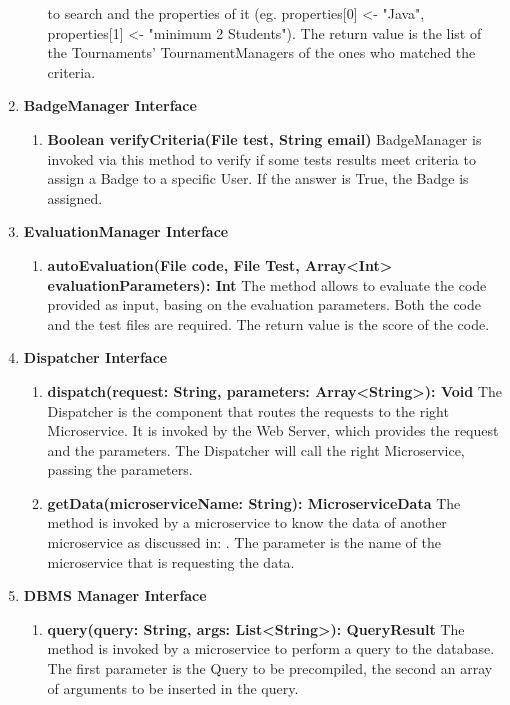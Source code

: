 \begin{enumerate}
\begin{enumerate}[label=$\bullet$]
            to search and the properties of it (eg. properties[0] <- "Java", properties[1] <- "minimum 2 Students"). The return value is the list of the Tournaments' TournamentManagers of the ones who matched the criteria.
        \end{enumerate}
    \item \textbf{BadgeManager Interface}
        \begin{enumerate}[label=$\bullet$]
            \item \textbf{Boolean verifyCriteria(File test, String email)} BadgeManager is invoked via this method to verify if some tests results meet criteria to assign a Badge to a specific User. If the answer is True, the Badge
            is assigned.
        \end{enumerate}
    \item \textbf{EvaluationManager Interface}
        \begin{enumerate}[label=$\bullet$]
            \item \textbf{autoEvaluation(File code, File Test, Array<Int> evaluationParameters): Int} The method allows to evaluate the code provided as input, basing on the evaluation parameters. Both the code and the test files are
            required. The return value is the score of the code.
        \end{enumerate}
    \item \textbf{Dispatcher Interface}
        \begin{enumerate}[label=$\bullet$]
            \item \textbf{dispatch(request: String, parameters: Array<String>): Void} The Dispatcher is the component that routes the requests to the right Microservice. It is invoked by the Web Server, which provides the request and the 
            parameters. The Dispatcher will call the right Microservice, passing the parameters.
            \item \textbf{getData(microserviceName: String): MicroserviceData} \label{meth:dispGetData}The method is invoked by a microservice to know the data of another microservice as discussed in: . The parameter is the name of the microservice that is requesting the data.
        \end{enumerate}
    \item \textbf{DBMS Manager Interface}
        \begin{enumerate} [label=$\bullet$]
            \item \textbf{query(query: String, args: List<String>): QueryResult} The method is invoked by a microservice to perform a query to the database. The first parameter is the Query to be precompiled, the second an array of arguments to be inserted in the query.
    \end{enumerate}
\end{enumerate}
